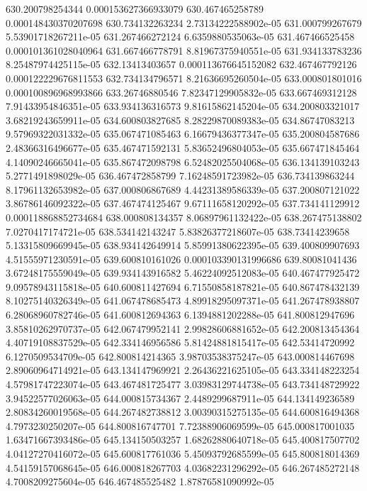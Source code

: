 {630.200798254344 0.000153627366933079
630.467465258789 0.000148430370207698
630.734132263234 2.73134222588902e-05
631.000799267679 5.53901718267211e-05
631.267466272124 6.6359880535063e-05
631.467466525458 0.000101361028040964
631.667466778791 8.81967375940551e-05
631.934133783236 8.25487974425115e-05
632.13413403657 0.000113676645152082
632.467467792126 0.000122229676811553
632.734134796571 8.21636695260504e-05
633.000801801016 0.000100896968993866
633.26746880546 7.82347129905832e-05
633.667469312128 7.91433954846351e-05
633.934136316573 9.81615862145204e-05
634.200803321017 3.68219243659911e-05
634.600803827685 8.28229870089383e-05
634.86747083213 9.57969322031332e-05
635.067471085463 6.16679436377347e-05
635.200804587686 2.48366316496677e-05
635.467471592131 5.83652496804053e-05
635.667471845464 4.14090246665041e-05
635.867472098798 6.52482025504068e-05
636.134139103243 5.2771491898029e-05
636.467472858799 7.16248591723982e-05
636.734139863244 8.17961132653982e-05
637.000806867689 4.44231389586339e-05
637.200807121022 3.86786146092322e-05
637.467474125467 9.67111658120292e-05
637.734141129912 0.000118868852734684
638.000808134357 8.06897961132422e-05
638.267475138802 7.0270417174721e-05
638.534142143247 5.83826377218607e-05
638.73414239658 5.13315809669945e-05
638.934142649914 5.85991380622395e-05
639.400809907693 4.51555971230591e-05
639.600810161026 0.000103390131996686
639.80081041436 3.67248175559049e-05
639.934143916582 5.46224092512083e-05
640.467477925472 9.09578943115818e-05
640.600811427694 6.71550858187821e-05
640.867478432139 8.10275140326349e-05
641.067478685473 4.89918295097371e-05
641.267478938807 6.28068960782746e-05
641.600812694363 6.1394881202288e-05
641.800812947696 3.85810262970737e-05
642.067479952141 2.99828606881652e-05
642.200813454364 4.40719108837529e-05
642.334146956586 5.81424881815417e-05
642.53414720992 6.1270509534709e-05
642.800814214365 3.98703538375247e-05
643.000814467698 2.89060964714921e-05
643.134147969921 2.26436221625105e-05
643.334148223254 4.57981747223074e-05
643.467481725477 3.03983129744738e-05
643.734148729922 3.94522577026063e-05
644.000815734367 2.4489299687911e-05
644.134149236589 2.80834260019568e-05
644.267482738812 3.00390315275135e-05
644.600816494368 4.7973230250207e-05
644.800816747701 7.72388906069599e-05
645.000817001035 1.63471667393486e-05
645.134150503257 1.68262880640718e-05
645.400817507702 4.04127270416072e-05
645.600817761036 5.45093792685599e-05
645.800818014369 4.54159157068645e-05
646.000818267703 4.03682231296292e-05
646.267485272148 4.7008209275604e-05
646.467485525482 1.87876581090992e-05
}
